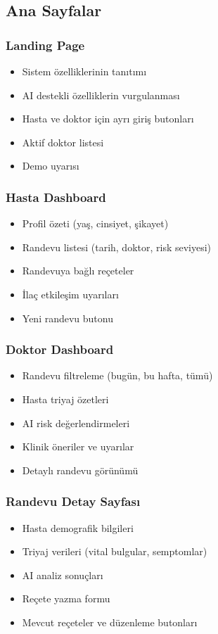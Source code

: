 \documentclass[12pt,a4paper]{article}
\begin{document}
\subsection{Ana Sayfalar}

\subsubsection{Landing Page}
\begin{itemize}
    \item Sistem özelliklerinin tanıtımı
    \item AI destekli özelliklerin vurgulanması
    \item Hasta ve doktor için ayrı giriş butonları
    \item Aktif doktor listesi
    \item Demo uyarısı
\end{itemize}

\subsubsection{Hasta Dashboard}
\begin{itemize}
    \item Profil özeti (yaş, cinsiyet, şikayet)
    \item Randevu listesi (tarih, doktor, risk seviyesi)
    \item Randevuya bağlı reçeteler
    \item İlaç etkileşim uyarıları
    \item Yeni randevu butonu
\end{itemize}

\subsubsection{Doktor Dashboard}
\begin{itemize}
    \item Randevu filtreleme (bugün, bu hafta, tümü)
    \item Hasta triyaj özetleri
    \item AI risk değerlendirmeleri
    \item Klinik öneriler ve uyarılar
    \item Detaylı randevu görünümü
\end{itemize}

\subsubsection{Randevu Detay Sayfası}
\begin{itemize}
    \item Hasta demografik bilgileri
    \item Triyaj verileri (vital bulgular, semptomlar)
    \item AI analiz sonuçları
    \item Reçete yazma formu
    \item Mevcut reçeteler ve düzenleme butonları
\end{itemize}
\end{document}
